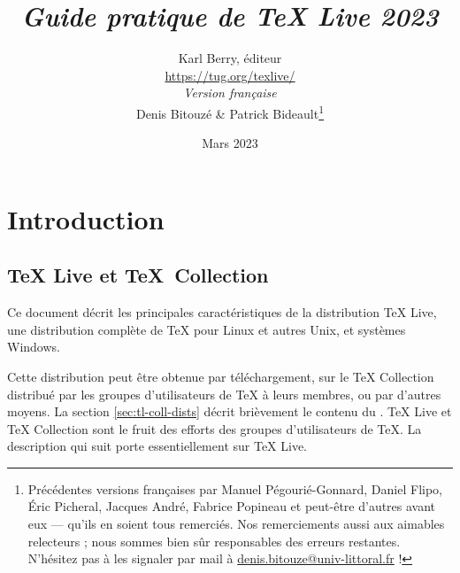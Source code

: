 \documentclass[german, english, french]{article}
\renewcommand{\TL}{\TeX{} Live\xspace}%
\renewcommand{\TK}{\TeX{} Collection\xspace}%
\newcommand*\semail[1]{\href{mailto:#1}{#1}}
\begin{document}
\title{%
  \huge \emph{Guide pratique de \TL 2023}%
}

\author{
  Karl Berry, éditeur \\[3mm]
  \url{https://tug.org/texlive/} \\[6mm]
  \textit{Version française} \\[3mm]
  Denis Bitouzé \& Patrick Bideault\thanks{%
    Précédentes versions françaises par Manuel Pégourié-Gonnard, Daniel Flipo,
    Éric Picheral, Jacques André, Fabrice Popineau et peut-être d'autres avant
    eux --- qu'ils en soient tous remerciés. Nos remerciements aussi aux
    aimables relecteurs ; nous sommes bien sûr responsables des erreurs
    restantes. N'hésitez pas à les signaler par mail
    à \semail{denis.bitouze@univ-littoral.fr} !%
  }%
}


\date{Mars 2023}

\maketitle

\begin{multicols}{2}
  \tableofcontents
\end{multicols}

\section{Introduction}
\label{sec:intro}

\subsection{\protect\TL{} et \protect\TeX\ Collection}

Ce document décrit les principales caractéristiques de la distribution \TL{},
une distribution complète de \TeX{} pour Linux et autres Unix, \macOS{} et
systèmes Windows.

Cette distribution peut être obtenue par téléchargement, sur le \DVD{} \TK{}
distribué par les groupes d'utilisateurs de \TeX{} à leurs membres, ou par
d'autres moyens.  La section \ref{sec:tl-coll-dists} décrit brièvement le
contenu du \DVD.  \TL{} et \TK{} sont le fruit des efforts des groupes
d'utilisateurs de \TeX. La description qui suit porte essentiellement sur \TL{}.
\end{document}
